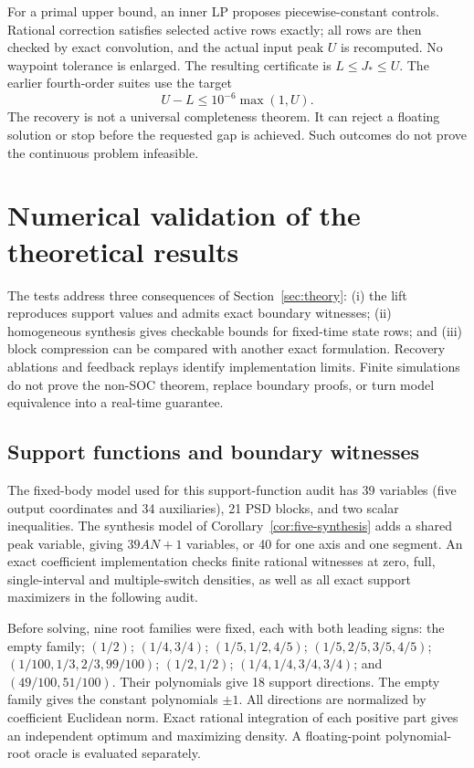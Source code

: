 \documentclass[pdflatex,sn-mathphys-num]{sn-jnl}
\theoremstyle{thmstyleone}
\theoremstyle{thmstyletwo}\newtheorem{remark}[theorem]{Remark}
\begin{document}
For a primal upper bound, an inner LP proposes piecewise-constant controls.
Rational correction satisfies selected active rows exactly; all rows are
then checked by exact convolution, and the actual input peak $U$ is
recomputed. No waypoint tolerance is enlarged. The resulting certificate is
$L\le J_*\le U$. The earlier fourth-order suites use the target
\begin{equation}\label{eq:tolerance}
 U-L\le10^{-6}\max(1,U).
\end{equation}
The recovery is not a universal completeness theorem. It can reject a
floating solution or stop before the requested gap is achieved. Such outcomes
do not prove the continuous problem infeasible.

\section{Numerical validation of the theoretical results}\label{sec:validation}
The tests address three consequences of Section~\ref{sec:theory}:
(i) the lift reproduces support values and admits exact boundary witnesses;
(ii) homogeneous synthesis gives checkable bounds for fixed-time state rows;
and (iii) block compression can be compared with another exact formulation.
Recovery ablations and feedback replays identify implementation limits.
Finite simulations do not prove the non-SOC theorem, replace boundary proofs,
or turn model equivalence into a real-time guarantee.

\subsection{Support functions and boundary witnesses}\label{sec:support-validation}
The fixed-body model used for this support-function audit has 39 variables
(five output coordinates and 34 auxiliaries), 21 PSD blocks, and two scalar
inequalities. The synthesis model of Corollary~\ref{cor:five-synthesis}
adds a shared peak variable, giving $39AN+1$ variables, or 40 for one axis
and one segment. An exact coefficient implementation checks finite rational
witnesses at zero, full, single-interval and multiple-switch densities, as well
as all exact support maximizers in the following audit.

Before solving, nine root families were fixed, each with both leading signs:
the empty family; $(1/2)$; $(1/4,3/4)$; $(1/5,1/2,4/5)$;
$(1/5,2/5,3/5,4/5)$; $(1/100,1/3,2/3,99/100)$; $(1/2,1/2)$;
$(1/4,1/4,3/4,3/4)$; and $(49/100,51/100)$. Their polynomials give 18
support directions. The empty family gives the constant polynomials $\pm1$.
All directions are normalized by coefficient Euclidean norm. Exact rational
integration of each positive part gives an independent optimum and maximizing
density. A floating-point polynomial-root oracle is evaluated separately.
\end{document}
